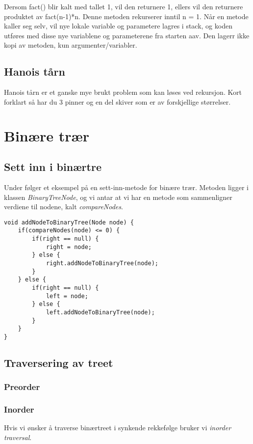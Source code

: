 \documentclass[11pt]{article}
\begin{document}
Dersom fact() blir kalt med tallet 1, vil den returnere 1, ellers vil den returnere produktet av fact(n-1)*n. Denne metoden rekurserer inntil n = 1.
Når en metode kaller seg selv, vil nye lokale variable og parametere lagres i stack, og koden utføres med disse nye variablene og parameterene fra starten aav. Den lagerr ikke kopi av metoden, kun argumenter/variabler.
\subsection{Hanois tårn}
\label{sec-9-1}

Hanois tårn er et ganske mye brukt problem som kan løses ved rekursjon.
Kort forklart så har du 3 pinner og en del skiver som er av forskjellige størrelser.
\section{Binære trær}
\label{sec-10}
\subsection{Sett inn i binærtre}
\label{sec-10-1}

Under følger et eksempel på en sett-inn-metode for binære
trær. Metoden ligger i klassen \emph{BinaryTreeNode}, og vi antar at vi har
en metode som sammenligner verdiene til nodene, kalt \emph{compareNodes}.


\begin{verbatim}
void addNodeToBinaryTree(Node node) {
    if(compareNodes(node) <= 0) {
        if(right == null) {
            right = node;
        } else {
            right.addNodeToBinaryTree(node);
        }
    } else {
        if(right == null) {
            left = node;
        } else {
            left.addNodeToBinaryTree(node);
        } 
    }
}
\end{verbatim}
\subsection{Traversering av treet}
\label{sec-10-2}
\subsubsection{Preorder}
\label{sec-10-2-1}
\subsubsection{Inorder}
\label{sec-10-2-2}

Hvis vi ønsker å traverse binærtreet i synkende rekkefølge bruker vi
\emph{inorder traversal}.
\end{document}
